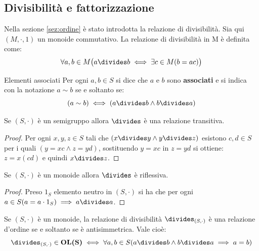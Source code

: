 \subsection{Divisibilità e fattorizzazione}\label{sez:associati}
Nella sezione \ref{sez:ordine} è stato introdotta la relazione di divisibilità. Sia qui $(M,\cdot,1)$ un monoide commutativo. La relazione di divisibilità in M è definita come:
\begin{equation}
	\forall a,b \in M \bigl( a \divides b \iff \exists c \in M (b=ac)\bigr)
\end{equation}

\begin{defbox}{Elementi associati}
	Per ogni $a,b \in S$ si dice che $a$ e $b$ sono \textbf{associati} e si indica con la notazione $a \sim b$ se e soltanto se:
	\begin{equation}
		(a \sim b)\iff (a \divides b \land b \divides a)
	\end{equation}
\end{defbox}

\begin{propbox}
	Se $(S,\cdot)$ è un semigruppo allora $\divides$ è una relazione transitiva.
\end{propbox}

\begin{proof}
	Per ogni $x,y,z \in S$ tali che $(x \divides y \land y \divides z)$ esistono $c,d \in S$ per i quali $(y = xc \land z = yd)$, sostituendo $y=xc$ in $z=yd$ si ottiene: $z=x(cd)$ e quindi $x \divides z$.
\end{proof}

\begin{propbox}
	Se $(S,\cdot)$ è un monoide allora $\divides$ è riflessiva.
\end{propbox}

\begin{proof}
	Preso $1_{S}$ elemento neutro in $(S,\cdot)$ si ha che per ogni $a \in S (a = a \cdot 1_{S}) \implies a \divides a$. 
\end{proof}

\begin{propbox}
	Se $(S,\cdot)$ è un monoide, la relazione di divisibilità  $\divides_{(S,\cdot)}$ è una relazione d'ordine se e soltanto se è antisimmetrica. Vale cioè:
	\[\divides_{(S,\cdot)} \in \textbf{OL(S)} \iff \forall a,b \in S (a \divides b \land b \divides a \implies a = b)\]
\end{propbox}


